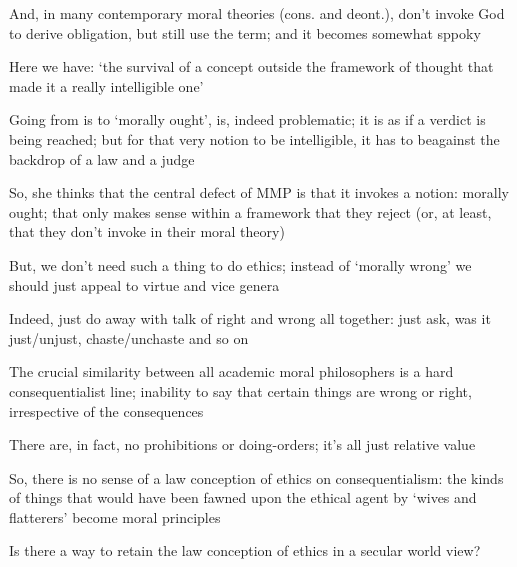 \documentclass[11pt]{article}
\begin{document}
\noindent And, in many contemporary moral theories (cons. and deont.), don't invoke God to derive obligation, but still use the term; and it becomes somewhat sppoky
\vspace*{2mm}

\noindent Here we have: `the survival of a concept outside the framework of thought that made it a really intelligible one'
\vspace*{2mm}

\noindent Going from is to `morally ought', is, indeed problematic; it is as if a verdict is being reached; but for that very notion to be intelligible, it has to beagainst the backdrop of a law and a judge
\vspace*{2mm}

\noindent So, she thinks that the central defect of MMP is that it invokes a notion: morally ought; that only makes sense within a framework that they reject (or, at least, that they don't invoke in their moral theory)
\vspace*{2mm}

\noindent But, we don't need such a thing to do ethics; instead of `morally wrong' we should just appeal to virtue and vice genera
\vspace*{2mm}

\noindent Indeed, just do away with talk of right and wrong all together: just ask, was it just/unjust, chaste/unchaste and so on
\vspace*{2mm}

\noindent The crucial similarity between all academic moral philosophers is a hard consequentialist line; inability to say that certain things are wrong or right, irrespective of the consequences
\vspace*{2mm}

\noindent There are, in fact, no prohibitions or doing-orders; it's all just relative value
\vspace*{2mm}

\noindent So, there is no sense of a law conception of ethics on consequentialism: the kinds of things that would have been fawned upon the ethical agent by `wives and flatterers' become moral principles
\vspace*{2mm}

\noindent Is there a way to retain the law conception of ethics in a secular world view?
\end{document}
